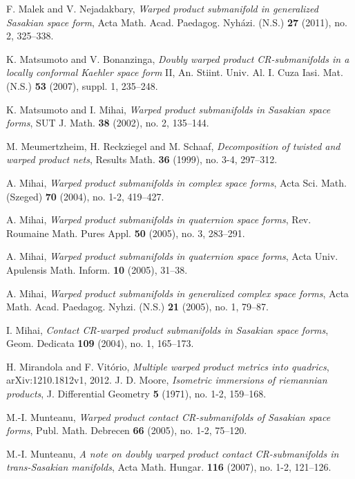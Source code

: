 \documentclass{amsart}
\theoremstyle{plain}
\numberwithin{equation}{section}
\theoremstyle{remark}
\numberwithin{equation}{section}
\begin{document}
\begin{thebibliography}{120}
 F. Malek and V. Nejadakbary, {\it  Warped product submanifold in generalized Sasakian space form},  Acta Math. Acad. Paedagog. Nyh\'azi. (N.S.) {\bf 27} (2011), no. 2, 325--338.

 K. Matsumoto and V. Bonanzinga, {\it  Doubly warped product CR-submanifolds in a locally conformal Kaehler space form} II, An. Stiint. Univ. Al. I. Cuza Iasi. Mat. (N.S.) {\bf 53} (2007), suppl. 1, 235--248.

 K. Matsumoto and I. Mihai,  {\it  Warped product submanifolds in Sasakian space forms},  SUT J. Math. {\bf 38} (2002), no. 2, 135--144.

 M. Meumertzheim, H. Reckziegel and M. Schaaf,  {\it Decomposition of twisted and warped product nets},  Results Math.   {\bf 36} (1999), no. 3-4, 297--312.

 A. Mihai,  {\it   Warped product submanifolds in complex space forms}, Acta Sci. Math. (Szeged) {\bf 70} (2004), no. 1-2, 419--427.

 A. Mihai,  {\it  Warped product submanifolds in quaternion space forms}, Rev. Roumaine Math. Pures Appl. {\bf 50} (2005), no. 3, 283--291.

 A. Mihai,  {\it Warped product submanifolds in quaternion space forms},  Acta Univ. Apulensis Math. Inform.  {\bf 10} (2005), 31--38.

 A. Mihai,  {\it  Warped product submanifolds in generalized complex space forms}, Acta Math. Acad. Paedagog. Nyhzi. (N.S.) {\bf 21} (2005), no. 1, 79--87.

 I.  Mihai, {\it Contact CR-warped product submanifolds in Sasakian space forms}, Geom. Dedicata {\bf 109} (2004),  no. 1, 165--173. 

 H. Mirandola and F. Vit\'orio, {\it Multiple warped product metrics into quadrics}, arXiv:1210.1812v1, 2012.
 J. D. Moore,  {\it Isometric immersions of riemannian  products}, J. Differential Geometry {\bf 5} (1971), no. 1-2, 159--168.

 M.-I. Munteanu, {\it  Warped product contact CR-submanifolds of Sasakian space forms},  Publ. Math. Debrecen {\bf 66 }(2005), no. 1-2, 75--120.

 M.-I. Munteanu, {\it A note on doubly warped product contact CR-submanifolds in trans-Sasakian manifolds}, Acta Math. Hungar. {\bf 116} (2007), no. 1-2, 121--126.


\end{thebibliography}
\end{document}
